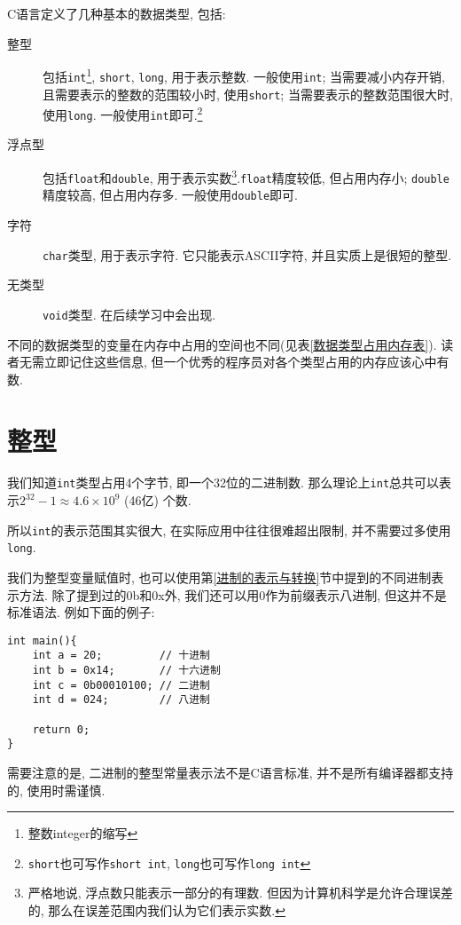         C语言定义了几种基本的数据类型, 包括:
        \begin{description}
            \item[整型]  包括\texttt{int}\footnote{整数integer的缩写}, \texttt{short}, \texttt{long}, 用于表示整数. 一般使用\texttt{int}; 当需要减小内存开销, 且需要表示的整数的范围较小时, 使用\texttt{short}; 当需要表示的整数范围很大时, 使用\texttt{long}. 一般使用\texttt{int}即可.\footnote{\texttt{short}也可写作\texttt{short int}, \texttt{long}也可写作\texttt{long int}}
            \item[浮点型] 包括\texttt{float}和\texttt{double}, 用于表示实数\footnote{严格地说, 浮点数只能表示一部分的有理数. 但因为计算机科学是允许合理误差的, 那么在误差范围内我们认为它们表示实数.}.\texttt{float}精度较低, 但占用内存小; \texttt{double}精度较高, 但占用内存多. 一般使用\texttt{double}即可.
            \item[字符] \texttt{char}类型, 用于表示字符. 它只能表示ASCII字符, 并且实质上是很短的整型.
            \item[无类型] \texttt{void}类型. 在后续学习中会出现.  
        \end{description}

        不同的数据类型的变量在内存中占用的空间也不同(见表\ref{数据类型占用内存表}). 读者无需立即记住这些信息, 但一个优秀的程序员对各个类型占用的内存应该心中有数.

    \section{整型}
        我们知道\texttt{int}类型占用4个字节, 即一个32位的二进制数. 那么理论上\texttt{int}总共可以表示$ 2 ^ {32} - 1 \approx 4.6 \times 10 ^ {9} $ (46亿) 个数.

        所以\texttt{int}的表示范围其实很大, 在实际应用中往往很难超出限制, 并不需要过多使用\texttt{long}.

        我们为整型变量赋值时, 也可以使用第\ref{进制的表示与转换}节中提到的不同进制表示方法. 除了提到过的0b和0x外, 我们还可以用0作为前缀表示八进制, 但这并不是标准语法. 例如下面的例子:
\begin{lstlisting}
int main(){
    int a = 20;         // 十进制
    int b = 0x14;       // 十六进制
    int c = 0b00010100; // 二进制
    int d = 024;        // 八进制

    return 0;
}
\end{lstlisting}

        需要注意的是, 二进制的整型常量表示法不是C语言标准, 并不是所有编译器都支持的, 使用时需谨慎.

